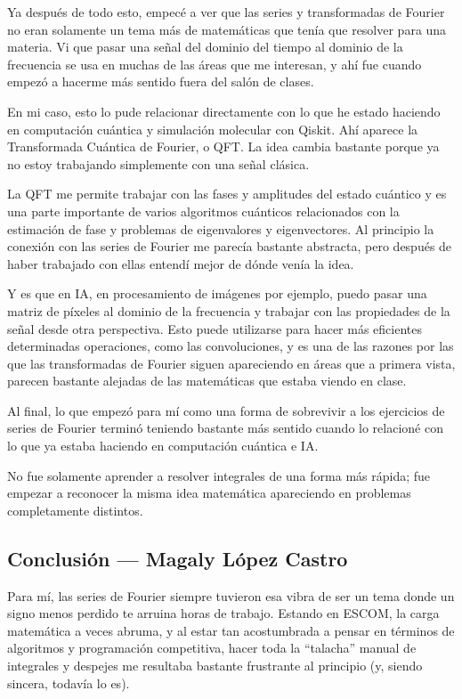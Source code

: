 Ya después de todo esto, empecé a ver que las series y transformadas de Fourier no eran solamente un tema más de matemáticas que tenía que resolver para una materia. Vi que pasar una señal del dominio del tiempo al dominio de la frecuencia se usa en muchas de las áreas que me interesan, y ahí fue cuando empezó a hacerme más sentido fuera del salón de clases.

En mi caso, esto lo pude relacionar directamente con lo que he estado haciendo en computación cuántica y simulación molecular con Qiskit. Ahí aparece la Transformada Cuántica de Fourier, o QFT. La idea cambia bastante porque ya no estoy trabajando simplemente con una señal clásica.

La QFT me permite trabajar con las fases y amplitudes del estado cuántico y es una parte importante de varios algoritmos cuánticos relacionados con la estimación de fase y problemas de eigenvalores y eigenvectores. Al principio la conexión con las series de Fourier me parecía bastante abstracta, pero después de haber trabajado con ellas entendí mejor de dónde venía la idea.

Y es que en IA, en procesamiento de imágenes por ejemplo, puedo pasar una matriz de píxeles al dominio de la frecuencia y trabajar con las propiedades de la señal desde otra perspectiva. Esto puede utilizarse para hacer más eficientes determinadas operaciones, como las convoluciones, y es una de las razones por las que las transformadas de Fourier siguen apareciendo en áreas que a primera vista, parecen bastante alejadas de las matemáticas que estaba viendo en clase.

Al final, lo que empezó para mí como una forma de sobrevivir a los ejercicios de series de Fourier terminó teniendo bastante más sentido cuando lo relacioné con lo que ya estaba haciendo en computación cuántica e IA.

No fue solamente aprender a resolver integrales de una forma más rápida; fue empezar a reconocer la misma idea matemática apareciendo en problemas completamente distintos.

\clearpage

\subsection{Conclusión — Magaly López Castro}
\label{sec:cap01:conclusiones:magaly}

Para mí, las series de Fourier siempre tuvieron esa vibra de ser un tema donde un signo menos perdido te arruina horas de trabajo. Estando en ESCOM, la carga matemática a veces abruma, y al estar tan acostumbrada a pensar en términos de algoritmos y programación competitiva, hacer toda la ``talacha'' manual de integrales y despejes me resultaba bastante frustrante al principio (y, siendo sincera, todavía lo es).

